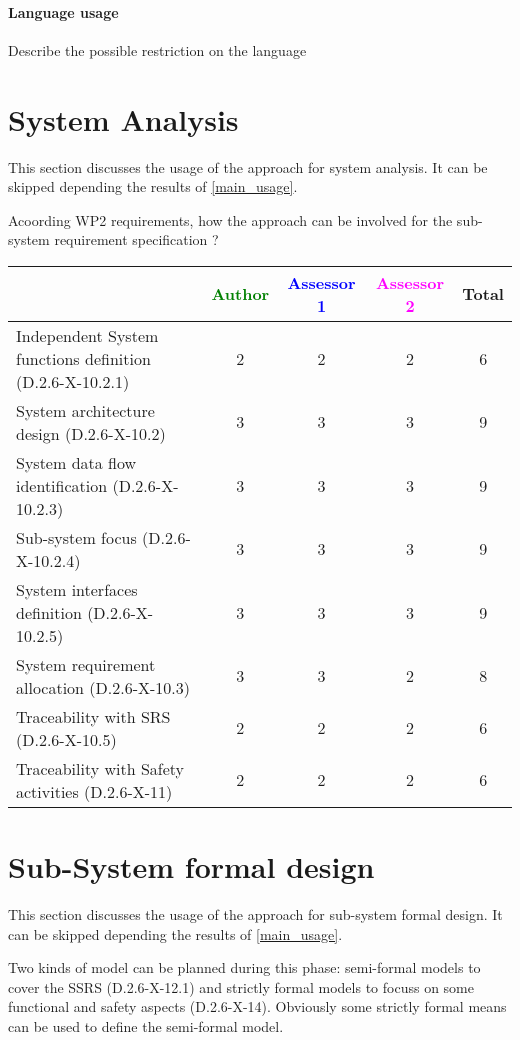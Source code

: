 \paragraph{Language usage} Describe the possible restriction on the language

\section{System Analysis}
This section discusses the usage of the approach for system analysis.
It can be skipped depending the results of \ref{main_usage}.

Acoording WP2 requirements, how the approach can be involved for the sub-system requirement specification ?

\begin{tabular}{|l | c | c | c | c|}
\hline
& \textcolor{green}{Author} & \textcolor{blue}{Assessor 1} & \textcolor{magenta}{Assessor 2} & Total \\
\hline
Independent System functions definition (D.2.6-X-10.2.1)  &2 &2 & 2& 6 \\
\hline 
System architecture design (D.2.6-X-10.2) &3 &3 & 3& 9 \\
\hline
System data flow identification (D.2.6-X-10.2.3)  &3 &3 & 3& 9 \\
\hline
Sub-system focus (D.2.6-X-10.2.4)  &3 &3 & 3& 9 \\
\hline
System interfaces definition (D.2.6-X-10.2.5)  &3 &3 & 3& 9 \\
\hline
System requirement allocation (D.2.6-X-10.3)  &3 &3 & 2&  8 \\
\hline
Traceability with SRS (D.2.6-X-10.5)  &2 &2 & 2& 6  \\
\hline
Traceability with Safety activities (D.2.6-X-11)  &2 &2 & 2 & 6   \\
\hline
\end{tabular}



\section{Sub-System formal design}
This section discusses the usage of the approach for sub-system formal design.
It can be skipped depending the results of \ref{main_usage}.

Two kinds of model can be planned during this phase: semi-formal models to  cover the SSRS (D.2.6-X-12.1) and strictly formal  models to  focuss on some functional and safety aspects (D.2.6-X-14).  Obviously some strictly  formal means can be used to define the semi-formal  model.

